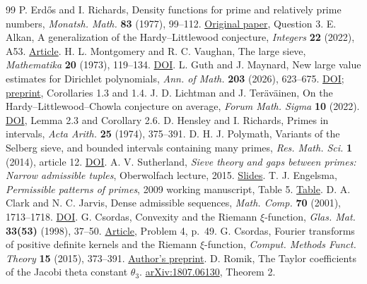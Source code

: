 \documentclass[11pt,a4paper]{article}
\begin{document}
\begin{thebibliography}{99}
 P. Erd\H{o}s and I. Richards, Density functions for prime and relatively prime numbers, \emph{Monatsh. Math.} \textbf{83} (1977), 99--112. \href{https://renyi.hu/~p_erdos/1977-09.pdf}{Original paper}, Question 3.
 E. Alkan, A generalization of the Hardy--Littlewood conjecture, \emph{Integers} \textbf{22} (2022), A53. \href{https://math.colgate.edu/~integers/w53/w53.pdf}{Article}.
 H. L. Montgomery and R. C. Vaughan, The large sieve, \emph{Mathematika} \textbf{20} (1973), 119--134. \href{https://doi.org/10.1112/S0025579300004708}{DOI}.
 L. Guth and J. Maynard, New large value estimates for Dirichlet polynomials, \emph{Ann. of Math.} \textbf{203} (2026), 623--675. \href{https://doi.org/10.4007/annals.2026.203.2.6}{DOI}; \href{https://arxiv.org/html/2405.20552v1}{preprint}, Corollaries 1.3 and 1.4.
 J. D. Lichtman and J. Ter\"av\"ainen, On the Hardy--Littlewood--Chowla conjecture on average, \emph{Forum Math. Sigma} \textbf{10} (2022). \href{https://doi.org/10.1017/fms.2022.54}{DOI}, Lemma 2.3 and Corollary 2.6.
 D. Hensley and I. Richards, Primes in intervals, \emph{Acta Arith.} \textbf{25} (1974), 375--391.
 D. H. J. Polymath, Variants of the Selberg sieve, and bounded intervals containing many primes, \emph{Res. Math. Sci.} \textbf{1} (2014), article 12. \href{https://doi.org/10.1186/s40687-014-0012-7}{DOI}.
 A. V. Sutherland, \emph{Sieve theory and gaps between primes: Narrow admissible tuples}, Oberwolfach lecture, 2015. \href{https://math.mit.edu/~drew/PrimeGapsOberwolfach3.pdf}{Slides}. T. J. Engelsma, \emph{Permissible patterns of primes}, 2009 working manuscript, Table 5. \href{https://www.opertech.com/primes/permissiblepatterns.pdf}{Table}.
 D. A. Clark and N. C. Jarvis, Dense admissible sequences, \emph{Math. Comp.} \textbf{70} (2001), 1713--1718. \href{https://doi.org/10.1090/S0025-5718-01-01348-5}{DOI}.
 G. Csordas, Convexity and the Riemann $\xi$-function,
\emph{Glas. Mat.} \textbf{33(53)} (1998), 37--50. \href{https://web.math.pmf.unizg.hr/glasnik/33.1/33105.pdf}{Article}, Problem 4, p.~49.
 G. Csordas, Fourier transforms of positive definite kernels and the Riemann $\xi$-function, \emph{Comput. Methods Funct. Theory} \textbf{15} (2015), 373--391. \href{https://arxiv.org/abs/1309.0055}{Author's preprint}.
 D. Romik, The Taylor coefficients of the Jacobi theta constant $\theta_3$. \href{https://arxiv.org/abs/1807.06130}{arXiv:1807.06130}, Theorem 2.

\end{thebibliography}
\end{document}
